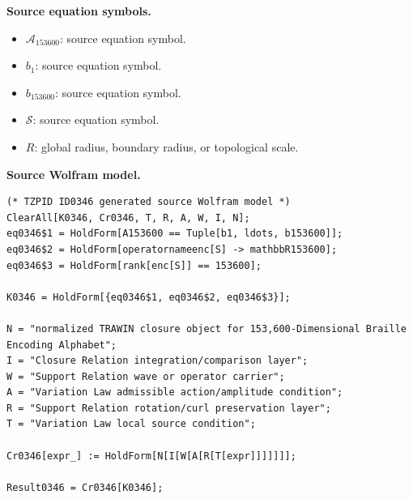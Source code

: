 \begin{minipage}[t]{0.49\linewidth}
\begingroup
\small
\raggedright
\textbf{Source equation symbols.}\par
\begin{itemize}[leftmargin=1.35em,itemsep=1pt,topsep=1pt,parsep=0pt]
    \item $\mathcal{A}_{153600}$: source equation symbol.
    \item $b_{1}$: source equation symbol.
    \item $b_{153600}$: source equation symbol.
    \item $\mathcal{S}$: source equation symbol.
    \item $R$: global radius, boundary radius, or topological scale.
\end{itemize}
\endgroup
\end{minipage}\hfill
\begin{minipage}[t]{0.47\linewidth}
\begingroup
\scriptsize
\raggedright
\textbf{Source Wolfram model.}\par
\begin{Verbatim}[fontsize=\tiny,breaklines=true,breakanywhere=true]
(* TZPID ID0346 generated source Wolfram model *)
ClearAll[K0346, Cr0346, T, R, A, W, I, N];
eq0346$1 = HoldForm[A153600 == Tuple[b1, ldots, b153600]];
eq0346$2 = HoldForm[operatornameenc[S] -> mathbbR153600];
eq0346$3 = HoldForm[rank[enc[S]] == 153600];

K0346 = HoldForm[{eq0346$1, eq0346$2, eq0346$3}];

N = "normalized TRAWIN closure object for 153,600-Dimensional Braille Encoding Alphabet";
I = "Closure Relation integration/comparison layer";
W = "Support Relation wave or operator carrier";
A = "Variation Law admissible action/amplitude condition";
R = "Support Relation rotation/curl preservation layer";
T = "Variation Law local source condition";

Cr0346[expr_] := HoldForm[N[I[W[A[R[T[expr]]]]]]];

Result0346 = Cr0346[K0346];
\end{Verbatim}
\endgroup
\end{minipage}

